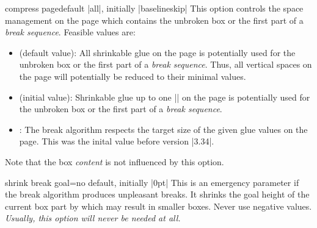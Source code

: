 \begin{docTcbKey}[][doc new=2014-12-15]{compress page}{}{default |all|, initially |baselineskip|}
  This option controls the space management on the page which contains the
  unbroken box or the first part of a \emph{break sequence}.
  Feasible  values are:
  \begin{itemize}
  \item{} (default value):
    All shrinkable glue on the page is potentially used for the
    unbroken box or the first part of a \emph{break sequence}. Thus, all
    vertical spaces on the page will potentially be reduced to their
    minimal values.
  \item{} (initial value):
    Shrinkable glue up to one |\baselineskip| on the page is potentially used for the
    unbroken box or the first part of a \emph{break sequence}.
  \item{}:
    The break algorithm respects the target size of the given glue values
    on the page. This was the inital value before version |3.34|.
  \end{itemize}
  \begin{marker}
  Note that the box \emph{content} is not influenced by this option.
  \end{marker}
\end{docTcbKey}


\begin{docTcbKey}{shrink break goal}{=}{no default, initially |0pt|}
  This is an emergency parameter if the break algorithm produces unpleasant
  breaks.
  It shrinks the goal height of the current box part by 
  which may result in smaller boxes. Never use negative values.
  \emph{Usually, this option will never be needed at all.}
\end{docTcbKey}



